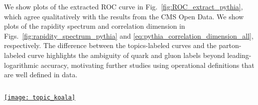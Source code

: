 \documentclass[aps,prd,twocolumn,preprintnumbers,nofootinbib,longbibliography,floatfix]{revtex4-1}
\DeclareRobustCommand{\Fig}[1]{Fig.~\ref{#1}}
\DeclareRobustCommand{\Figs}[2]{Figs.~\ref{#1} and \ref{#2}}
\newcommand{\Pythia}{{\sc Pythia}\xspace}
\begin{document}
We show plots of the extracted ROC curve in \Fig{fig:ROC_extract_pythia}, which agree qualitatively with the results from the CMS Open Data.
%
We show plots of the rapidity spectrum and correlation dimension in \Figs{fig:rapidity_spectrum_pythia}{eq:pythia_correlation_dimension_all}, respectively.
%
The difference between the topics-labeled curves and the parton-labeled curve highlights the ambiguity of quark and gluon labels beyond leading-logarithmic accuracy, motivating further studies using operational definitions that are well defined in data.


\begin{figure*}[t]
%
\centering
{}
$\quad$
%
\caption{
Same as \Fig{fig:correlation_dimension_all} but applied to the \Pythia 6.4.25 dataset.}
\label{eq:pythia_correlation_dimension_all}
\end{figure*}



\begin{flushright}

\href{https://www.freepik.com/catalyststuff}{\texttt{[image: topic\_koala]}}
\end{flushright}
\end{document}
